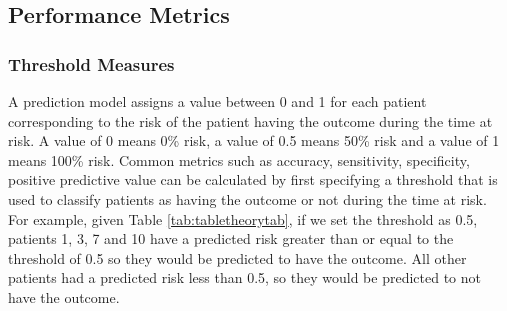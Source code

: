\documentclass[11pt]{book}
\theoremstyle{definition}
\theoremstyle{definition}
\theoremstyle{definition}
\theoremstyle{remark}
\begin{document}
\subsection{Performance Metrics}\label{performance}

\subsubsection*{Threshold Measures}\label{threshold-measures}

A prediction model assigns a value between 0 and 1 for each patient
corresponding to the risk of the patient having the outcome during the
time at risk. A value of 0 means 0\% risk, a value of 0.5 means 50\%
risk and a value of 1 means 100\% risk. Common metrics such as accuracy,
sensitivity, specificity, positive predictive value can be calculated by
first specifying a threshold that is used to classify patients as having
the outcome or not during the time at risk. For example, given Table
\ref{tab:tabletheorytab}, if we set the threshold as 0.5, patients 1, 3,
7 and 10 have a predicted risk greater than or equal to the threshold of
0.5 so they would be predicted to have the outcome. All other patients
had a predicted risk less than 0.5, so they would be predicted to not
have the outcome.  
 
\end{document}
